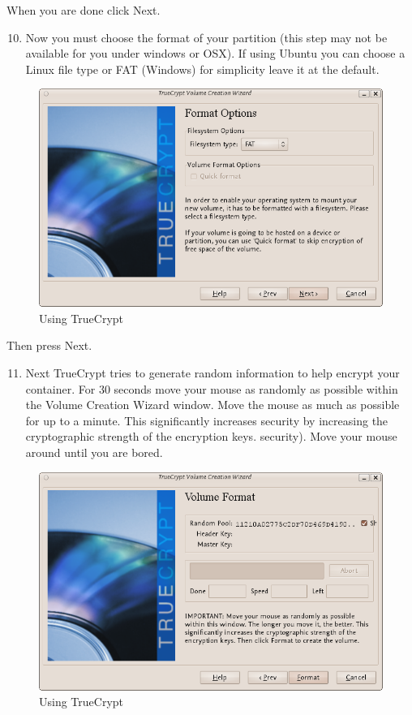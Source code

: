 When you are done click Next.

\begin{enumerate}[1.]
\setcounter{enumi}{9}
\item
  Now you must choose the format of your partition (this step may not be
  available for you under windows or OSX). If using Ubuntu you can
  choose a Linux file type or FAT (Windows) for simplicity leave it at
  the default.
\end{enumerate}
\begin{figure}[htbp]
\centering
\includegraphics{using_tc_009.png}
\caption{Using TrueCrypt}
\end{figure}

Then press Next.

\begin{enumerate}[1.]
\setcounter{enumi}{10}
\item
  Next TrueCrypt tries to generate random information to help encrypt
  your container. For 30 seconds move your mouse as randomly as possible
  within the Volume Creation Wizard window. Move the mouse as much as
  possible for up to a minute. This significantly increases security by
  increasing the cryptographic strength of the encryption keys.
  security). Move your mouse around until you are bored.
\end{enumerate}
\begin{figure}[htbp]
\centering
\includegraphics{using_tc_010.png}
\caption{Using TrueCrypt}
\end{figure}

